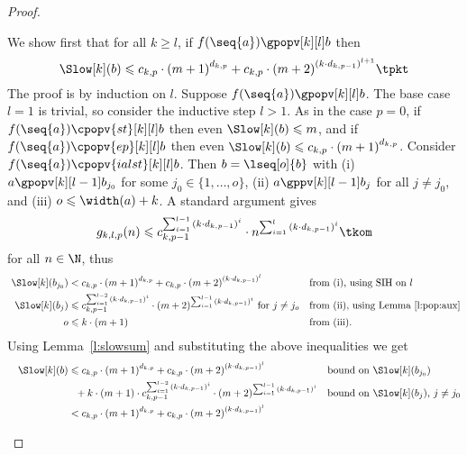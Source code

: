 \documentclass{LMCS}
\begin{document}
\begin{proof}
\begin{description}[leftmargin=0.3cm]
  \item[\dcase{$p > 0$}]
We show first that for all $k \geqslant l$, if $f(\seq{a}) \gpopv[k][l] b$ then
    \begin{equation}
      \label{t:pop:a}
      \Slow[k](b) \leqslant c_{k,p}  \cdot {(m+1)}^{d_{k,p}} + c_{k,p} \cdot {(m + 2)}^{{(k \cdot d_{k,p-1})}^{l+1}} \tpkt
    \end{equation}
    The proof is by induction on $l$. 
    Suppose $f(\seq{a}) \gpopv[k][l] b$. 
    The base case $l = 1$ is trivial, so consider the inductive step $l > 1$.
    As in the case $p = 0$,
    if $f(\seq{a}) \cpopv{st}[k][l] b$ then even $\Slow[k](b) \leqslant m$, 
    and if $f(\seq{a}) \cpopv{ep}[k][l] b$ then even $\Slow[k](b) \leqslant c_{k,p}  \cdot {(m+1)}^{d_{k,p}}$.
    Consider $f(\seq{a}) \cpopv{ialst}[k][l] b$.
    Then $b = \lseq[o]{b}$ with 
    (i) $a \gpopv[k][l-1] b_{j_0}$ for some $j_0 \in \{1,\dots,o\}$,
    (ii) $a \gppv[k][l-1] b_j$ for all $j \neq j_0$, and
    (iii) $o \leqslant \width(a) + k$.
    A standard argument gives
    \begin{align*}
      g_{k,l,p}(n) \leqslant c_{k,p-1}^{\sum_{i=1}^{l-1} {(k \cdot d_{k,p-1})}^i} \cdot n^{\sum_{i=1}^{l} {(k \cdot d_{k,p-1})}^i} \tkom
    \end{align*}
    for all $n \in \N$, thus
    \begin{align*}
      ~\Slow[k](b_{j_0}) & <  c_{k,p} \cdot {(m+1)}^{d_{k,p}} + c_{k,p} \cdot {(m + 2)}^{{(k \cdot d_{k,p-1})}^{l}}
      && \text{from (i), using SIH on $l$ } \\
      \Slow[k](b_j) & \leqslant c_{k,p-1}^{\sum_{i=1}^{l-2} {(k \cdot d_{k,p-1})}^i} \cdot (m+2)^{\sum_{i=1}^{l-1} {(k \cdot d_{k,p-1})}^i} \text{ for $j \not = j_o$} 
      && \text{from (ii), using Lemma~\ref{l:pop:aux}} \\
      o & \leqslant k \cdot (m + 1) && \text{from (iii).}
    \end{align*}
    Using Lemma~\ref{l:slowsum} and substituting 
    the above inequalities we get
    \begin{align*}
      \quad\Slow[k](b) 
      & \leqslant c_{k,p} \cdot {(m+1)}^{d_{k,p}} + c_{k,p} \cdot {(m + 2)}^{{(k \cdot d_{k,p-1})}^{l}} 
      && \text{bound on $\Slow[k](b_{j_0})$}\\
      & ~~ + k \cdot (m+1) \cdot c_{k,p-1}^{\sum_{i=1}^{l-2} {(k \cdot d_{k,p-1})}^i} \cdot {(m+2)}^{\sum_{i=1}^{l-1} {(k \cdot d_{k,p-1})}^i}
      && \text{bound on $\Slow[k](b_{j})$, $j \not=j_0$}\\
      & < c_{k,p} \cdot {(m+1)}^{d_{k,p}} + c_{k,p} \cdot {(m + 2)}^{{(k \cdot d_{k,p-1})}^{l}} \\

\end{align*}
\end{description}
\end{proof}
\end{document}

